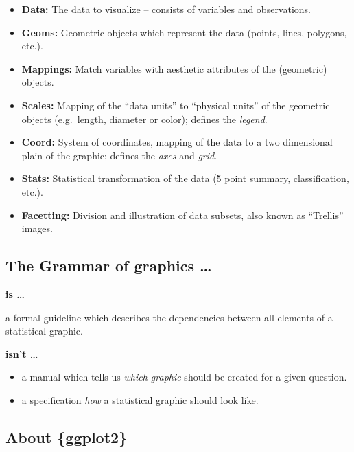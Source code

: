 \documentclass[]{book}
\providecommand{\tightlist}{%
  \setlength{\itemsep}{0pt}\setlength{\parskip}{0pt}}
\begin{document}
\begin{itemize}
\item
  \textbf{Data:} The data to visualize -- consists of variables and observations.
\item
  \textbf{Geoms:} Geometric objects which represent the data (points, lines, polygons, etc.).
\item
  \textbf{Mappings:} Match variables with aesthetic attributes of the (geometric) objects.
\item
  \textbf{Scales:} Mapping of the ``data units'' to ``physical units'' of the geometric objects (e.g.~length, diameter or color); defines the \emph{legend}.
\item
  \textbf{Coord:} System of coordinates, mapping of the data to a two dimensional plain of the graphic; defines the \emph{axes} and \emph{grid}.
\item
  \textbf{Stats:} Statistical transformation of the data (5 point summary, classification, etc.).
\item
  \textbf{Facetting:} Division and illustration of data subsets, also known as ``Trellis'' images.
\end{itemize}

\hypertarget{the-grammar-of-graphics}{%
\subsection{The Grammar of graphics \ldots{}}\label{the-grammar-of-graphics}}

\textbf{is \ldots{}}

a formal guideline which describes the dependencies between all elements of a
statistical graphic.

\textbf{isn't \ldots{}}

\begin{itemize}
\tightlist
\item
  a manual which tells us \emph{which graphic} should be created for a given question.
\item
  a specification \emph{how} a statistical graphic should look like.
\end{itemize}

\hypertarget{about-ggplot2}{%
\subsection{About \{ggplot2\}}\label{about-ggplot2}}
\end{document}
